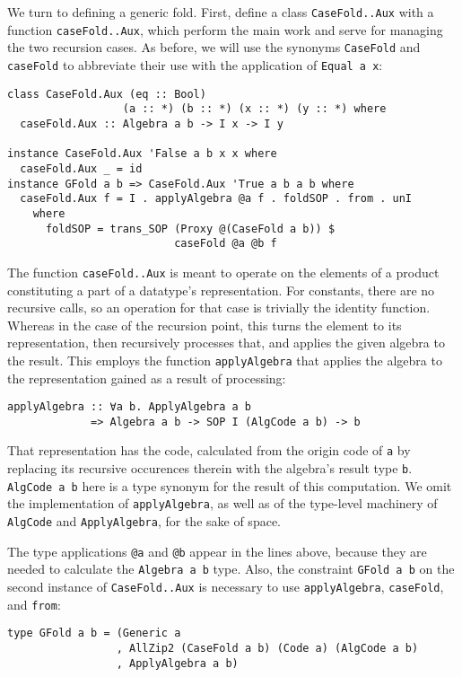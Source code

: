 \documentclass[runningheads]{llncs}
\newcommand{\K}[1]{\lstinline[style=fancy]{#1}}
\begin{document}
We turn to defining a generic fold. First, define a class \K{CaseFold..Aux} with a function \K{caseFold..Aux}, which perform the main work and serve for managing the two recursion cases. As before, we will use the synonyms \K{CaseFold} and \K{caseFold} to abbreviate their use with the application of \K{Equal a x}:
\begin{lstlisting}[style=fancy]
class CaseFold.Aux (eq :: Bool)
                  (a :: *) (b :: *) (x :: *) (y :: *) where
  caseFold.Aux :: Algebra a b -> I x -> I y

instance CaseFold.Aux 'False a b x x where
  caseFold.Aux _ = id
instance GFold a b => CaseFold.Aux 'True a b a b where
  caseFold.Aux f = I . applyAlgebra @a f . foldSOP . from . unI
    where
      foldSOP = trans_SOP (Proxy @(CaseFold a b)) $
                          caseFold @a @b f
\end{lstlisting}
The function \K{caseFold..Aux} is meant to operate on the elements of a product constituting a part of a datatype's representation. For constants, there are no recursive calls, so an operation for that case is trivially the identity function. Whereas in the case of the recursion point, this turns the element to its representation, then recursively processes that, and applies the given algebra to the result. This employs the function \K{applyAlgebra} that applies the algebra to the representation gained as a result of processing:
\begin{lstlisting}[style=fancy]
applyAlgebra :: ∀a b. ApplyAlgebra a b
             => Algebra a b -> SOP I (AlgCode a b) -> b
\end{lstlisting}
That representation has the code, calculated from the origin code of \K{a} by replacing its recursive occurences therein with the algebra's result type \K{b}. \K{AlgCode a b} here is a type synonym for the result of this computation. We omit the implementation of \K{applyAlgebra}, as well as of the type-level machinery of \K{AlgCode} and \K{ApplyAlgebra}, for the sake of space.

The type applications \K{@a} and \K{@b} appear in the lines above, because they are needed to calculate the \K{Algebra a b} type. Also, the constraint \K{GFold a b} on the second instance of \K{CaseFold..Aux} is necessary to use \K{applyAlgebra}, \K{caseFold}, and \K{from}:
\begin{lstlisting}[style=fancy]
type GFold a b = (Generic a
                 , AllZip2 (CaseFold a b) (Code a) (AlgCode a b)
                 , ApplyAlgebra a b)
\end{lstlisting}
\end{document}
